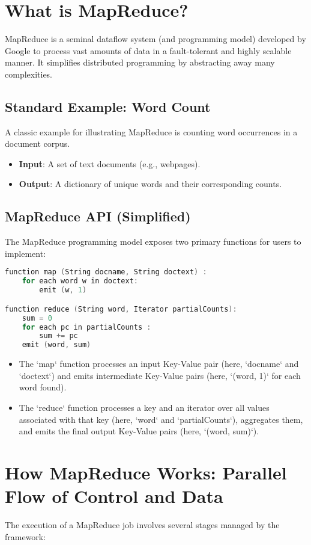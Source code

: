 \documentclass{article}
\begin{document}
\section*{What is MapReduce?}
MapReduce is a seminal dataflow system (and programming model) developed by Google to process vast amounts of data in a fault-tolerant and highly scalable manner. It simplifies distributed programming by abstracting away many complexities.

\subsection*{Standard Example: Word Count}
A classic example for illustrating MapReduce is counting word occurrences in a document corpus.
\begin{itemize}
    \item \textbf{Input}: A set of text documents (e.g., webpages).
    \item \textbf{Output}: A dictionary of unique words and their corresponding counts.
\end{itemize}

\subsection*{MapReduce API (Simplified)}
The MapReduce programming model exposes two primary functions for users to implement:
\begin{lstlisting}[language=C]
function map (String docname, String doctext) :
    for each word w in doctext:
        emit (w, 1)

function reduce (String word, Iterator partialCounts):
    sum = 0
    for each pc in partialCounts :
        sum += pc
    emit (word, sum)
\end{lstlisting}
\begin{itemize}
    \item The `map` function processes an input Key-Value pair (here, `docname` and `doctext`) and emits intermediate Key-Value pairs (here, `(word, 1)` for each word found).
    \item The `reduce` function processes a key and an iterator over all values associated with that key (here, `word` and `partialCounts`), aggregates them, and emits the final output Key-Value pairs (here, `(word, sum)`).
\end{itemize}

\section*{How MapReduce Works: Parallel Flow of Control and Data}
The execution of a MapReduce job involves several stages managed by the framework:
\end{document}
